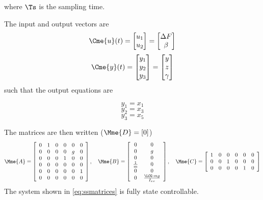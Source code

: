 where $\Ts$ is the sampling time.

The input and output vectors are 
\[
\Cme{u}(t) = \begin{bmatrix}
u_1 \\
u_2
\end{bmatrix} = \begin{bmatrix}
\Delta F \\
\beta
\end{bmatrix}
\]
\[
\Cme{y}(t) = \begin{bmatrix}
y_1 \\
y_2 \\
y_3
\end{bmatrix} = \begin{bmatrix}
y \\
z \\
\gamma
\end{bmatrix}
\]
such that the output equations are

\begin{equation}
	y_1 = x_1 
\end{equation}
\begin{equation}
	y_2 = x_3
\end{equation}
\begin{equation}
	y_3 = x_5
\end{equation}

The matrices are then written ($\Mme{D} = [0]$)
\begin{equation} \label{eq:ssmatrices}
	\Mme{A} = 
	\left[\begin{array}{cccccc} 0 & 1 & 0 & 0 & 0 & 0\\ 0 & 0 & 0 & 0 & g & 0\\ 0 & 0 & 0 & 1 & 0 & 0\\ 0 & 0 & 0 & 0 & 0 & 0\\ 0 & 0 & 0 & 0 & 0 & 1\\ 0 & 0 & 0 & 0 & 0 & 0 \end{array}\right],\quad \Mme{B} = 
	\left[\begin{array}{cc} 0 & 0\\ 0 & g\\ 0 & 0\\ \frac{1}{m} & 0\\ 0 & 0\\ 0 & \frac{\LCG \cdot mg}{I_{xx}} \end{array}\right], \quad \Mme{C} =  \left[\begin{array}{cccccc} 1 & 0 & 0 & 0 & 0 & 0\\ 0 & 0 & 1 & 0 & 0 & 0\\ 0 & 0 & 0 & 0 & 1 & 0 \end{array}\right]
\end{equation}
The system shown in \eqref{eq:ssmatrices} is fully state controllable.
